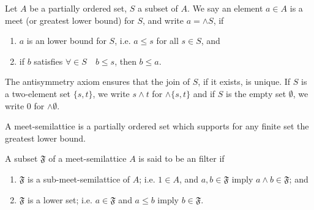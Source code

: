 \documentclass{beamer}
\theoremstyle{plain}
\begin{document}
\begin{frame}
	
		\begin{definition}\label{upper_defn}
	Let $A$ be a partially ordered set, $S$ a subset of $A$. We say an element $a \in A$
	is a \alert{ meet} (or \alert{ greatest lower bound}) for $S$, and write $a = \wedge S$, if 
	\begin{enumerate}
		\item [(a)] $a$ is an lower bound for $S$, i.e. $a \le s$ for all $s \in S$, and 
		\item [(b)] if $b$ satisfies $\forall \in S\quad  b \le s$, then $b \le a$. 
	\end{enumerate}
	The antisymmetry axiom  ensures that the join of $S$, if it exists, is 
	unique. If $S$ is a two-element set $\{s, t\}$, we write $s \wedge t$ for $\wedge \{s, t\}$ and if $S$	is the empty set $\emptyset$, we write $0$ for  $\wedge \emptyset$.
\end{definition}

\begin{definition}\label{lattice_defn}
	A \alert{meet-semilattice} is a partially ordered set which supports for any finite set the  greatest lower bound.
\end{definition}
\begin{definition}\label{filter_defn}
	A subset $\mathfrak F$ of a meet-semilattice $A$ is said to be an \alert{ filter} if
	\begin{enumerate}
		\item [(a)] $\mathfrak F$ is a sub-meet-semilattice of $A$; i.e. $1\in A$, and $a, b \in \mathfrak F$  imply  	$a \wedge b \in \mathfrak F$; and
		\item [(b)] $\mathfrak F$ is a lower set; i.e. $a \in \mathfrak F$ and $ a\le b$ imply $b \in \mathfrak F$.  
	\end{enumerate}
\end{definition}
\end{frame}
\end{document}
